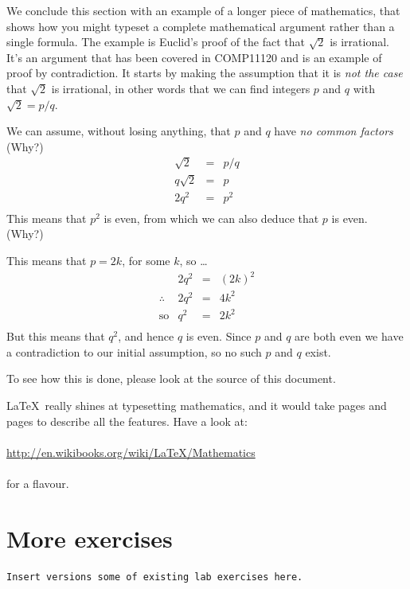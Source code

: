 \begin{refsection}
  We conclude this section with an example of a longer piece of mathematics, that shows how you might typeset a complete mathematical argument rather than a single formula. The example is Euclid's proof of the fact that $\sqrt{2}$ is irrational. It's an argument that has been covered in COMP11120 and is an example of proof by contradiction. It starts by making the assumption that it is \emph{not the case} that $\sqrt{2}$ is irrational, in other words that we can find integers $p$ and $q$ with $\sqrt{2} = p/q$.

  We can assume, without losing anything, that $p$ and $q$ have \emph{no common factors} (Why?)
  \[
  \begin{array}{lcl}
     \sqrt{2} & = & p/q \\ 
      q\sqrt{2} & = & p\\ 
      2q^2 & = & p^2\\ 
  \end{array}
  \]
  This means that $p^2$ is even, from which we can also deduce that $p$ is even. (Why?)

  This means that $p = 2k$, for some $k$, so \ldots
  \[
  \begin{array}{llcl}
      & 2q^2 & = & (2k)^2\\ 
      \therefore & 2q^2 & = & 4k^2\\ 
      \text{so} & q^2 & = & 2k^2\\
   \end{array}
  \]
  But this means that $q^2$, and hence $q$ is  even. Since $p$ and $q$ are both even we have a contradiction to our initial assumption, so no such $p$ and $q$ exist.

  To see how this is done, please look at the source of this document.

  \LaTeX\ really shines at typesetting mathematics, and it would take pages and pages to describe all the features. Have a look at:
\\
\\
\href{http://en.wikibooks.org/wiki/LaTeX/Mathematics}{http://en.wikibooks.org/wiki/LaTeX/Mathematics}
\\
\\
for a flavour. 
 
\section{More exercises}
\begin{verbatim}
Insert versions some of existing lab exercises here.
\end{verbatim}

\end{refsection}
